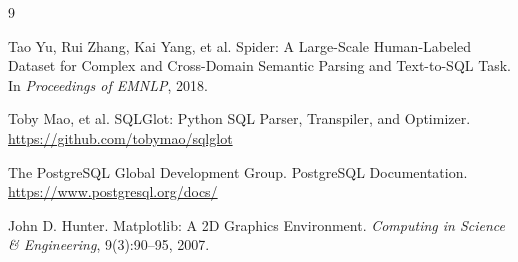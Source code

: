 \documentclass[11pt]{article}
\begin{document}
\begin{thebibliography}{9}

Tao Yu, Rui Zhang, Kai Yang, et al.
\newblock Spider: A Large-Scale Human-Labeled Dataset for Complex and Cross-Domain Semantic Parsing and Text-to-SQL Task.
\newblock In \emph{Proceedings of EMNLP}, 2018.

Toby Mao, et al.
\newblock SQLGlot: Python SQL Parser, Transpiler, and Optimizer.
\newblock \url{https://github.com/tobymao/sqlglot}

The PostgreSQL Global Development Group.
\newblock PostgreSQL Documentation.
\newblock \url{https://www.postgresql.org/docs/}

John D. Hunter.
\newblock Matplotlib: A 2D Graphics Environment.
\newblock \emph{Computing in Science \& Engineering}, 9(3):90--95, 2007.

\end{thebibliography}
\end{document}
